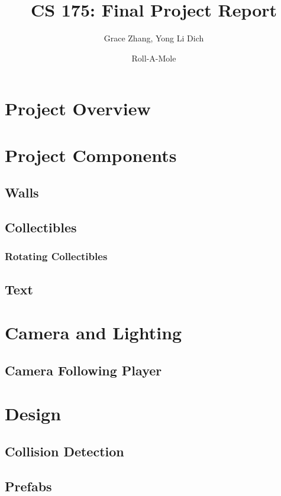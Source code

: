 \documentclass[12pt]{article}
\begin{document}
\title{\vspace{-1.0cm}\textbf{CS 175: Final Project Report}}
\author{Grace Zhang, Yong Li Dich}
\date{Roll-A-Mole}
\maketitle

\newpage
\tableofcontents

\newpage
 
\section{Project Overview}

\section{Project Components}
\subsection{Walls}
\subsection{Collectibles}
\subsubsection{Rotating Collectibles}
\subsection{Text}

\section{Camera and Lighting}
\subsection{Camera Following Player}

\section{Design}
\subsection{Collision Detection}
\subsection{Prefabs}
\end{document}
